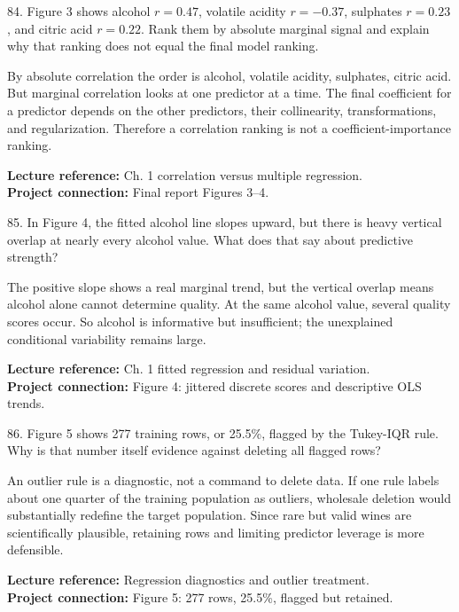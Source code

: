 \documentclass[10.5pt,a4paper]{article}
\newcommand{\chapref}[1]{\textbf{Lecture reference:} #1}
\newcommand{\projectref}[1]{\textbf{Project connection:} #1}
\begin{document}
\begin{qbox}{84. Figure 3 shows alcohol \(r=0.47\), volatile acidity \(r=-0.37\), sulphates \(r=0.23\), and citric acid \(r=0.22\). Rank them by absolute marginal signal and explain why that ranking does not equal the final model ranking.}
\end{qbox}
\begin{answerbox}
By absolute correlation the order is alcohol, volatile acidity, sulphates, citric acid. But marginal correlation looks at one predictor at a time. The final coefficient for a predictor depends on the other predictors, their collinearity, transformations, and regularization. Therefore a correlation ranking is not a coefficient-importance ranking.
\end{answerbox}
\begin{refbox}\chapref{Ch. 1 correlation versus multiple regression.}\\\projectref{Final report Figures 3--4.}\end{refbox}

\begin{qbox}{85. In Figure 4, the fitted alcohol line slopes upward, but there is heavy vertical overlap at nearly every alcohol value. What does that say about predictive strength?}
\end{qbox}
\begin{answerbox}
The positive slope shows a real marginal trend, but the vertical overlap means alcohol alone cannot determine quality. At the same alcohol value, several quality scores occur. So alcohol is informative but insufficient; the unexplained conditional variability remains large.
\end{answerbox}
\begin{refbox}\chapref{Ch. 1 fitted regression and residual variation.}\\\projectref{Figure 4: jittered discrete scores and descriptive OLS trends.}\end{refbox}

\begin{qbox}{86. Figure 5 shows 277 training rows, or 25.5\%, flagged by the Tukey-IQR rule. Why is that number itself evidence against deleting all flagged rows?}
\end{qbox}
\begin{answerbox}
An outlier rule is a diagnostic, not a command to delete data. If one rule labels about one quarter of the training population as outliers, wholesale deletion would substantially redefine the target population. Since rare but valid wines are scientifically plausible, retaining rows and limiting predictor leverage is more defensible.
\end{answerbox}
\begin{refbox}\chapref{Regression diagnostics and outlier treatment.}\\\projectref{Figure 5: 277 rows, 25.5\%, flagged but retained.}\end{refbox}
\end{document}
